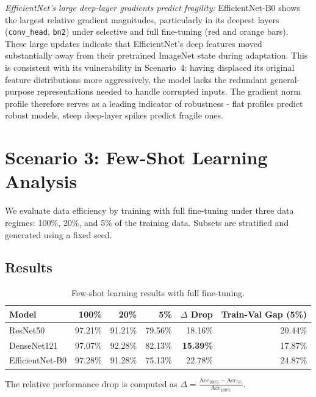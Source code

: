 \documentclass[11pt, a4paper]{article}
\begin{document}
\textit{EfficientNet's large deep-layer gradients predict fragility:}
EfficientNet-B0 shows the largest relative gradient magnitudes,
particularly in its deepest layers (\texttt{conv\_head}, \texttt{bn2})
under selective and full fine-tuning (red and orange bars). These large
updates indicate that EfficientNet's deep features moved substantially
away from their pretrained ImageNet state during adaptation. This is
consistent with its vulnerability in Scenario~4: having displaced its
original feature distributions more aggressively, the model lacks the
redundant general-purpose representations needed to handle corrupted
inputs. The gradient norm profile therefore serves as a leading
indicator of robustness - flat profiles predict robust models, steep
deep-layer spikes predict fragile ones.
\section{Scenario 3: Few-Shot Learning Analysis}

We evaluate data efficiency by training with full fine-tuning under three data regimes: 100\%, 20\%, and 5\% of the training data. Subsets are stratified and generated using a fixed seed.

\subsection{Results}

\begin{table}[H]
\centering
\caption{Few-shot learning results with full fine-tuning.}
\label{tab:s3}
\begin{tabular}{lrrrrr}
\toprule
\textbf{Model} & \textbf{100\%} & \textbf{20\%} & \textbf{5\%} & \textbf{$\Delta$ Drop} & \textbf{Train-Val Gap (5\%)} \\
\midrule
ResNet50 & 97.21\% & 91.21\% & 79.56\% & 18.16\% & 20.44\% \\
DenseNet121 & 97.07\% & 92.28\% & 82.13\% & \textbf{15.39\%} & 17.87\% \\
EfficientNet-B0 & 97.28\% & 91.28\% & 75.13\% & 22.78\% & 24.87\% \\
\bottomrule
\end{tabular}
\end{table}

\noindent The relative performance drop is computed as $\Delta = \frac{\text{Acc}_{100\%} - \text{Acc}_{5\%}}{\text{Acc}_{100\%}}$.
\end{document}
